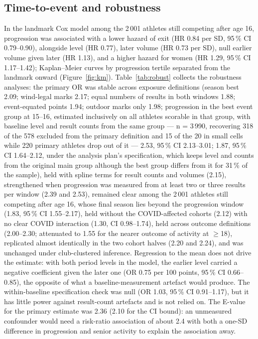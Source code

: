 \documentclass[12pt,a4paper]{article}
\begin{document}
\subsection{Time-to-event and robustness}

In the landmark Cox model among the 2\,001 athletes still competing after age 16, progression was associated with a lower hazard of exit (HR 0.84 per SD, 95\,\% CI 0.79--0.90), alongside level (HR 0.77), later volume (HR 0.73 per SD), null earlier volume given later (HR 1.13), and a higher hazard for women (HR 1.29, 95\,\% CI 1.17--1.42); Kaplan--Meier curves by progression tertile separated from the landmark onward (Figure~\ref{fig:km}). Table~\ref{tab:robust} collects the robustness analyses: the primary OR was stable across exposure definitions (season best 2.09; wind-legal marks 2.17; equal numbers of results in both windows 1.88; event-equated points 1.94; outdoor marks only 1.98; progression in the best event group at 15--16, estimated inclusively on all athletes scorable in that group, with baseline level and result counts from the same group --- n = 3\,990, recovering 318 of the 578 excluded from the primary definition and 15 of the 20 in small cells while 220 primary athletes drop out of it --- 2.53, 95\,\% CI 2.13--3.01; 1.87, 95\,\% CI 1.64--2.12, under the analysis plan's specification, which keeps level and counts from the original main group although the best group differs from it for 31\,\% of the sample), held with spline terms for result counts and volumes (2.15), strengthened when progression was measured from at least two or three results per window (2.39 and 2.53), remained clear among the 2\,001 athletes still competing after age 16, whose final season lies beyond the progression window (1.83, 95\,\% CI 1.55--2.17), held without the COVID-affected cohorts (2.12) with no clear COVID interaction (1.30, CI 0.98--1.74), held across outcome definitions (2.00--2.30; attenuated to 1.55 for the nearer outcome of activity at $\geq$18), replicated almost identically in the two cohort halves (2.20 and 2.24), and was unchanged under club-clustered inference. Regression to the mean does not drive the estimate: with both period levels in the model, the earlier level carried a negative coefficient given the later one (OR 0.75 per 100 points, 95\,\% CI 0.66--0.85), the opposite of what a baseline-measurement artefact would produce. The within-baseline specification check was null (OR 1.03, 95\,\% CI 0.91--1.17), but it has little power against result-count artefacts and is not relied on. The E-value for the primary estimate was 2.36 (2.10 for the CI bound): an unmeasured confounder would need a risk-ratio association of about 2.4 with both a one-SD difference in progression and senior activity to explain the association away.
\end{document}
